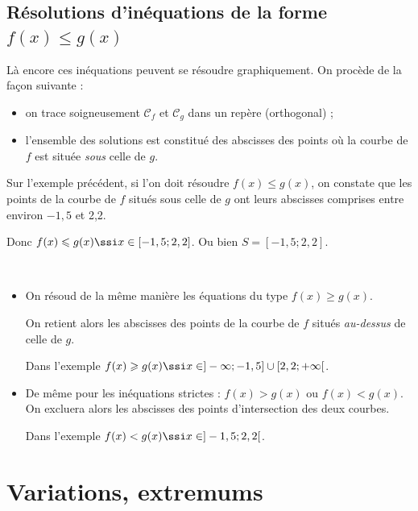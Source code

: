		

\subsection{R\'esolutions d'in\'equations de la forme $f(x)\leqslant g(x)$}

L\`a encore ces in\'equations peuvent se r\'esoudre graphiquement. On proc\`ede de la façon suivante :
\begin{itemize}
	\item on trace soigneusement $\mathcal{C}_f$ et $\mathcal{C}_g$ dans un rep\`ere (orthogonal) ;
	\item l'ensemble des solutions est constitu\'e des abscisses des points o\`u la courbe de $f$ est situ\'ee \emph{sous} celle de $g$.
\end{itemize}

\begin{exemple*} Sur l'exemple pr\'ec\'edent, si l'on doit r\'esoudre $f(x)\leqslant g(x)$, on constate que les points de la courbe de $f$ situ\'es sous celle de $g$ ont leurs abscisses comprises entre environ $-1,5$ et 2,2.

Donc $f(x)\leqslant g(x) \ssi x\in [-1,5;2,2]$. Ou bien $S=[-1,5;2,2]$.
\end{exemple*}

\begin{rmqs}~
\begin{itemize}
	\item On r\'esoud de la même mani\`ere les \'equations du type $f(x)\geqslant g(x)$.

On retient alors les abscisses des points de la courbe de $f$ situ\'es \emph{au-dessus} de celle de $g$.

Dans l'exemple $f(x)\geqslant g(x) \ssi x\in ] -\infty ; -1,5 ] \cup [2,2 ; +\infty[$.
	\item De même pour les in\'equations strictes : $f(x)>g(x)$ ou $f(x)<g(x)$. On excluera alors les abscisses des points d'intersection des deux courbes.

	Dans l'exemple $f(x)<g(x) \ssi x\in ]-1,5;2,2[$.
\end{itemize}
\end{rmqs}






\sautpage

\section{Variations, extremums}


